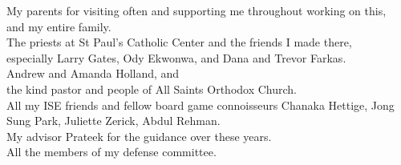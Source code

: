 {\centering
  My parents for visiting often and supporting me throughout working on this, \\
  and my entire family. \\
  The priests at St Paul's Catholic Center and the friends I made there, \\
  especially Larry Gates, Ody Ekwonwa, and Dana and Trevor Farkas. \\
  Andrew and Amanda Holland, and \\
  the kind pastor and people of All Saints Orthodox Church. \\
  All my ISE friends and fellow board game connoisseurs Chanaka Hettige, Jong Sung Park, Juliette Zerick, Abdul Rehman. \\
  My advisor Prateek for the guidance over these years. \\
  All the members of my defense committee. \\
}
 

